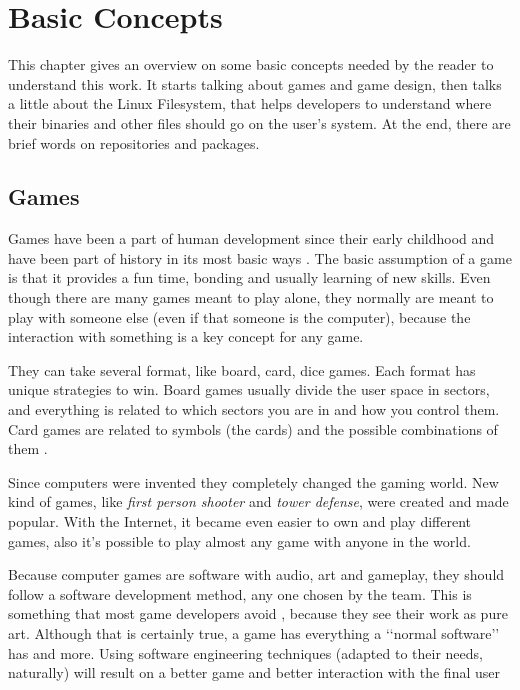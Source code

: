 \chapter{Basic Concepts}
\label {sec:basic_concepts}

This chapter gives an overview on some basic concepts needed by the reader to understand this work. It starts talking about games and game design, then talks a little about the Linux Filesystem, that helps developers to understand where their binaries and other files should go on the user's system. At the end, there are brief words on repositories and packages.

\section{Games}
\label {sec:games}

Games have been a part of human development since their early childhood and have been part of history in its most basic ways \cite{bethke2003game}. The basic assumption of a game is that it provides a fun time, bonding and usually learning of new skills. Even though there are many games meant to play alone, they normally are meant to play with someone else (even if that someone is the computer), because the interaction with something is a key concept for any game.

They can take several format, like board, card, dice games. Each format has unique strategies to win. Board games usually divide the user space in sectors, and everything is related to which sectors you are in and how you control them. Card games are related to symbols (the cards) and the possible combinations of them \cite{crawford1984art}.

Since computers were invented they completely changed the gaming world. New kind of games, like \textit{first person shooter} and \textit{tower defense}, were created and made popular. With the Internet, it became even easier to own and play different games, also it's possible to play almost any game with anyone in the world.

Because computer games are software with audio, art and gameplay, they should follow a software development method, any one chosen by the team. This is something that most game developers avoid \cite{bethke2003game}, because they see their work as pure art. Although that is certainly true, a game has everything a \lq\lq normal software\rq\rq{} has and more. Using software engineering techniques (adapted to their needs, naturally) will result on a better game and better interaction with the final user \cite{pressman2009software}

